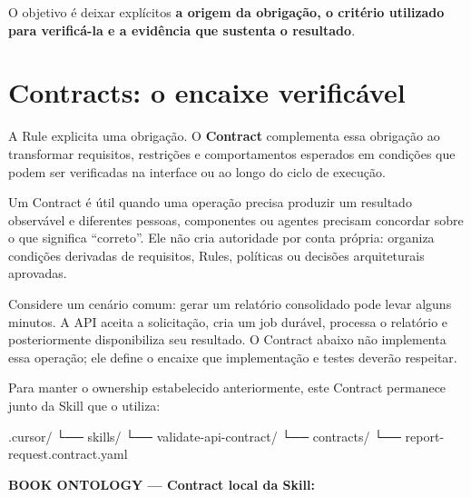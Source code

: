 \documentclass[
  10pt,
  a4paper,
  oneside]{book}
\newenvironment{Shaded}{}{}
\newcommand{\NormalTok}[1]{#1}
\renewenvironment{Shaded}{\begin{snugshade}}{\end{snugshade}}%
\begin{document}
O objetivo é deixar explícitos \textbf{a origem da obrigação, o critério
utilizado para verificá-la e a evidência que sustenta o resultado}.

\hypertarget{contracts-o-encaixe-verificuxe1vel}{%
\section{Contracts: o encaixe
verificável}\label{contracts-o-encaixe-verificuxe1vel}}

A Rule explicita uma obrigação. O \textbf{Contract} complementa essa
obrigação ao transformar requisitos, restrições e comportamentos
esperados em condições que podem ser verificadas na interface ou ao
longo do ciclo de execução.

Um Contract é útil quando uma operação precisa produzir um resultado
observável e diferentes pessoas, componentes ou agentes precisam
concordar sobre o que significa ``correto''. Ele não cria autoridade por
conta própria: organiza condições derivadas de requisitos, Rules,
políticas ou decisões arquiteturais aprovadas.

Considere um cenário comum: gerar um relatório consolidado pode levar
alguns minutos. A API aceita a solicitação, cria um job durável,
processa o relatório e posteriormente disponibiliza seu resultado. O
Contract abaixo não implementa essa operação; ele define o encaixe que
implementação e testes deverão respeitar.

Para manter o ownership estabelecido anteriormente, este Contract
permanece junto da Skill que o utiliza:

\begin{Shaded}
\begin{Highlighting}[]
\NormalTok{.cursor/}
\NormalTok{└── skills/}
\NormalTok{    └── validate{-}api{-}contract/}
\NormalTok{        └── contracts/}
\NormalTok{            └── report{-}request.contract.yaml}
\end{Highlighting}
\end{Shaded}

\textbf{BOOK ONTOLOGY --- Contract local da Skill:}
\end{document}
